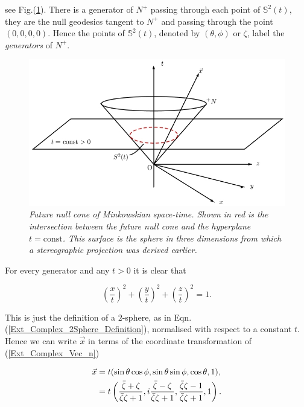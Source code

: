 \noindent see Fig.(\ref{Ext_Complex_Intersection_Cone_Plane_Fig}). There is a generator of $N^+$ passing through each point of $\mathbb{S}^2 (t)$, they are the null geodesics tangent to $N^+$ and passing through the point $(0,0,0,0)$. Hence the points of $\mathbb{S}^2 (t)$, denoted by $(\theta,\phi)$ or $\zeta$, label the \textit{generators} of $N^{+}$.

\begin{figure}[h!]
\begin{center}
\caption{\textit{Future null cone of Minkowskian space-time. Shown in red is the intersection between the future null cone and the hyperplane $t=\text{const}$. This surface is the sphere in three dimensions from which a stereographic projection was derived earlier.}}
\label{Ext_Complex_Intersection_Cone_Plane_Fig}
\includegraphics[scale=0.6]{figs/4_5.jpg}
\end{center}
\end{figure}

For every generator and any $t>0$ it is clear that

\begin{equation*}
\left(\frac{x}{t}\right)^2 +\left(\frac{y}{t}\right)^2 +\left(\frac{z}{t}\right)^2 = 1.
\end{equation*}

\noindent This is just the definition of a $2$-sphere, as in Eqn.(\ref{Ext_Complex_2Sphere_Definition}), normalised with respect to a constant $t$. Hence we can write $\vec{x}$ in terms of the coordinate transformation of (\ref{Ext_Complex_Vec_n})

\begin{align}\nonumber
\vec{x} & = t(\sin{\theta}\cos{\phi}, \sin{\theta}\sin{\phi}, \cos{\theta}, 1), \\\label{Ext_Complex_vec_x_relations}
        & = t
\begin{Huge}
\left( \frac{\bar{\zeta} + \zeta}{\bar{\zeta}\zeta + 1}  ,i\frac{\bar{\zeta} - \zeta}{\bar{\zeta}\zeta + 1}, \frac{\bar{\zeta}\zeta - 1}{\bar{\zeta}\zeta + 1},1  \right).
\end{Huge}
\end{align}

